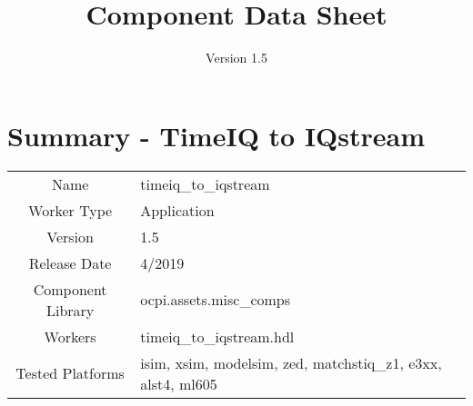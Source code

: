 \iffalse
This file is protected by Copyright. Please refer to the COPYRIGHT file
distributed with this source distribution.

This file is part of OpenCPI <http://www.opencpi.org>

OpenCPI is free software: you can redistribute it and/or modify it under the
terms of the GNU Lesser General Public License as published by the Free Software
Foundation, either version 3 of the License, or (at your option) any later
version.

OpenCPI is distributed in the hope that it will be useful, but WITHOUT ANY
WARRANTY; without even the implied warranty of MERCHANTABILITY or FITNESS FOR A
PARTICULAR PURPOSE. See the GNU Lesser General Public License for more details.

You should have received a copy of the GNU Lesser General Public License along
with this program. If not, see <http://www.gnu.org/licenses/>.
\fi

\def\docTitle{Component Data Sheet}
\def\docVersion{1.5}

\date{Version \docVersion} %
\title{\docTitle}
\lhead{\small{\docTitle}}

\usepackage{longtable} %

\def\comp{timeiq\_to\_iqstream}
\def\ecomp{timeiq_to_iqstream}
\def\Comp{TimeIQ to IQstream}
\graphicspath{ {figures/} }



\section*{Summary - \Comp}
\begin{tabular}{|c|M{13.5cm}|}
	\hline
	                  &                        							\\
	\hline
	Name              & \comp                  							\\
	\hline
	Worker Type       & Application            							\\
	\hline
	Version           & \docVersion                  							\\
	\hline
	Release Date      & 4/2019           						\\
	\hline
	Component Library & ocpi.assets.misc\_comps					\\
	\hline
	Workers           & \comp.hdl              							\\
	\hline
	Tested Platforms  & isim, xsim, modelsim, zed, matchstiq\_z1, e3xx, alst4, ml605	\\
	\hline
\end{tabular}
	
